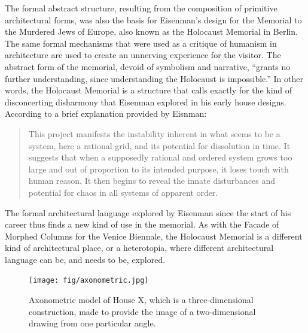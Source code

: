 The formal abstract structure, resulting from the composition of primitive architectural forms,
was also the basis for Eisenman's design for the Memorial to the Murdered Jews of Europe,
also known as the Holocaust Memorial in Berlin. The same formal mechanisms that were used as
a critique of humanism in architecture are used to create an unnerving experience for the
visitor.
The abstract form of the memorial, devoid of symbolism and narrative, ``grants no further
understanding, since understanding the Holocaust is impossible.''
In other words, the Holocaust Memorial is a structure that calls exactly for the kind of
disconcerting disharmony that Eisenman explored in his early house designs. According to
a brief explanation provided by Eisnman:

\begin{quote}
This project manifests the instability inherent in what seems to be a system, here a
rational grid, and its potential for dissolution in time. It suggests that when a supposedly
rational and ordered system grows too large and out of proportion to its intended purpose,
it loses touch with human reason. It then begins to reveal the innate disturbances and potential
for chaos in all systems of apparent order.
\end{quote}

The formal architectural language explored by Eisenman since the start of his career thus
finds a new kind of use in the memorial. As with the Facade of Morphed Columns for the Venice
Biennale, the Holocaust Memorial is a different kind of architectural place, or a heterotopia,
where different architectural language can be, and needs to be, explored.

%
%

\begin{figure}
\centering
\vspace{-1em}
\texttt{[image: fig/axonometric.jpg]}\quad
\caption{Axonometric model of House X, which is a three-dimensional construction,
made to provide the image of a two-dimensional drawing from one particular angle.}
\label{fig:axonometric}
\end{figure}

